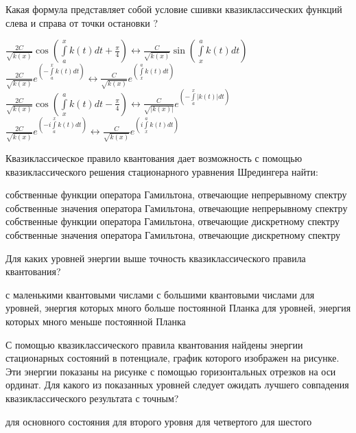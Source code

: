 \documentclass[11pt,a4paper]{exam}
\begin{document}
\begin{questions}
\question Какая формула представляет собой условие сшивки квазиклассических функций слева и справа от точки остановки ?
\begin{choices}
\choice $\frac{{2C}}{{\sqrt {k(x)} }}\cos \left( {\int\limits_a^x {k(t)dt}  + \frac{\pi }{4}} \right) \leftrightarrow \frac{C}{{\sqrt {k(x)} }}\sin \left( {\int\limits_x^a {k(t)dt} } \right)$    
\choice $\frac{{2C}}{{\sqrt {k(x)} }}{e^{\left( { - \int\limits_a^x {k(t)dt} } \right)}} \leftrightarrow \frac{C}{{\sqrt {k(x)} }}{e^{\left( {\int\limits_x^a {k(t)dt} } \right)}}$
\choice $\frac{{2C}}{{\sqrt {k(x)} }}\cos \left( {\int\limits_x^a {k(t)dt - } \frac{\pi }{4}} \right) \leftrightarrow \frac{C}{{\sqrt {|k(x)|} }}{e^{\left( { - \int\limits_a^x {|k(t)|dt} } \right)}}$    
\choice $\frac{{2C}}{{\sqrt {k(x)} }}{e^{\left( { - i\int\limits_a^x {k(t)dt} } \right)}} \leftrightarrow \frac{C}{{\sqrt {k(x)} }}{e^{\left( {i\int\limits_x^a {k(t)dt} } \right)}}$
\end{choices}

\question Квазиклассическое правило квантования дает возможность с помощью квазиклассического решения стационарного уравнения Шредингера найти:
\begin{choices}
\choice собственные функции оператора Гамильтона, отвечающие непрерывному спектру
\choice собственные значения оператора Гамильтона, отвечающие непрерывному спектру
\choice собственные функции оператора Гамильтона, отвечающие дискретному спектру
\choice собственные значения оператора Гамильтона, отвечающие дискретному спектру
\end{choices}

\question Для каких уровней энергии выше точность квазиклассического правила квантования?
\begin{choices}
\choice с маленькими квантовыми числами
\choice с большими квантовыми числами
\choice для уровней, энергия которых много больше постоянной Планка
\choice для уровней, энергия которых много меньше постоянной Планка
\end{choices}

\question С помощью квазиклассического правила квантования найдены энергии стационарных состояний в потенциале, график которого изображен на рисунке. Эти энергии показаны на рисунке с помощью горизонтальных отрезков на оси ординат. Для какого из показанных уровней следует ожидать лучшего совпадения квазиклассического результата с точным?
\begin{choices}
\choice для основного состояния    
\choice для второго уровня
\choice для четвертого       
\choice для шестого
\end{choices}


\end{questions}
\end{document}

